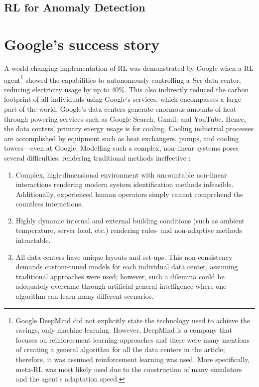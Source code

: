 \subsection{RL for Anomaly Detection}















\section{Google's success story}
A world-changing implementation of RL was demonstrated by Google when a RL agent\footnote{Google DeepMind did not explicitly state the technology used to achieve the savings, only machine learning. However, DeepMind is a company that focuses on reinforcement learning approaches and there were many mentions of creating a general algorithm for all the data centers in the article; therefore, it was assumed reinforcement learning was used. More specifically, meta-RL was most likely used due to the construction of many simulators and the agent's adaptation speed.} showed the capabilities to autonomously controlling a \textit{live} data center, reducing electricity usage by up to 40\%. This also indirectly reduced the carbon footprint of all individuals using Google's services, which encompasses a large part of the world. Google's data centers generate enormous amounts of heat through powering services such as Google Search, Gmail, and YouTube. Hence, the data centers' primary energy usage is for cooling. Cooling industrial processes are accomplished by equipment such as heat exchangers, pumps, and cooling towers---even at Google.  Modelling such a complex, non-linear systems poses several difficulties, rendering traditional methods ineffective \cite{google_data1}:
\begin{enumerate}
    \item Complex, high-dimensional environment with uncountable non-linear interactions rendering modern system identification methods infeasible. Additionally, experienced human operators simply cannot comprehend the countless interactions.
    \item Highly dynamic internal and external building conditions (such as ambient temperature, server load, etc.) rendering rules- and non-adaptive methods intractable.
    \item All data centers have unique layouts and set-ups.  This non-consistency demands custom-tuned models for each individual data center, assuming traditional approaches were used; however, such a dilemma could be adequately overcame through artificial general intelligence where one algorithm can learn many different scenarios.
\end{enumerate}
